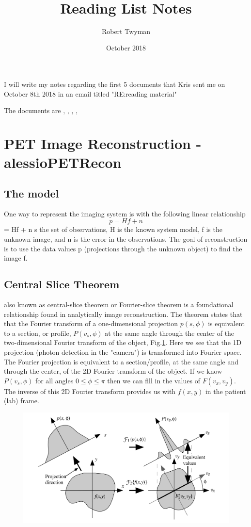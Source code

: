 \documentclass{article}
\title{Reading List Notes}
\author{Robert Twyman}
\date{October 2018}
\begin{document}
I will write my notes regarding the first 5 documents that Kris sent me on October 8th 2018 in an email titled "RE:reading material"

The documents are \cite{Alessio2006}, \cite{Bailey2014}, \cite{Zeng2001}, \cite{vanderVos2017}, \cite{Qi2006}

\section{PET Image Reconstruction - 
alessioPETRecon \cite{Alessio2006}}
\subsection{The model}
One way to represent the imaging system is with the following linear relationship
\begin{equation}\label{eq.model}
p = Hf + n 
\end{equation} 
= Hf + n s the set of observations, H is the known system model, f is the unknown image, and n is the error in the observations. The goal of reconstruction is to use the data values p (projections through the unknown object) to find the image f.
\subsection{Central Slice Theorem}
also known as central-slice theorem or Fourier-slice theorem is a foundational relationship found in analytically image reconstruction. The theorem states that that the Fourier transform of a one-dimensional projection $p(s, \phi)$ is equivalent to a section, or profile, $P(v_s,\phi)$ at the same angle through the center of the two-dimensional Fourier transform of the object, Fig.\ref{Fig.Central-Slice}. Here we see that the 1D projection (photon detection in the "camera") is transformed into Fourier space. The Fourier projection is equivalent to a section/profile, at the same angle and through the center, of the 2D Fourier transform of the object. If we know $P(v_s,\phi)$ for all angles $0\leq \phi \leq \pi$ then we can fill in the values of $F(v_x,v_y)$. The inverse of this 2D Fourier transform provides us with $f(x,y)$ in the patient (lab) frame.

\begin{figure} [h]
\centering
	\includegraphics[width=\linewidth]{Background Reading Analysis/Central-section_theorem.png}
    \caption{\label{Fig.Central-Slice}}
\end{figure}
\end{document}
